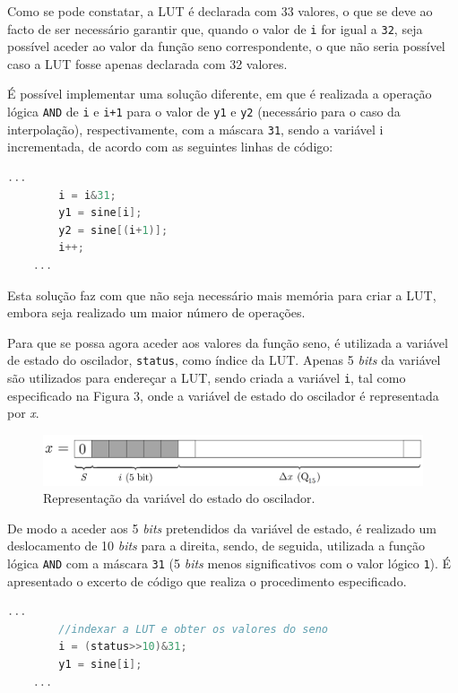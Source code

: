 \documentclass[11pt]{article}
\numberwithin{equation}{section}
\begin{document}
Como se pode constatar, a LUT é declarada com 33 valores, o que se deve ao facto de ser necessário garantir que, quando o valor de \texttt{i} for igual a \texttt{32}, seja possível aceder ao valor da função seno correspondente, o que não seria possível caso a LUT fosse apenas declarada com 32 valores.
 
É possível implementar uma solução diferente, em que é realizada a operação lógica \texttt{AND} de \texttt{i} e \texttt{i+1} para o valor de \texttt{y1} e \texttt{y2} (necessário para o caso  da interpolação), respectivamente, com a máscara \texttt{31}, sendo a variável i incrementada,  de acordo com as seguintes linhas de código:

\begin{lstlisting}[language=C]
	...
		i = i&31;
		y1 = sine[i];
		y2 = sine[(i+1)];
		i++;
	...
\end{lstlisting}

Esta solução faz com que não seja necessário mais memória para criar a LUT, embora seja realizado um maior número de operações.  

Para que se possa agora aceder aos valores da função seno, é utilizada a variável de estado do oscilador, \texttt{status}, como índice da LUT. Apenas 5 \textit{bits} da variável são utilizados para endereçar a LUT, sendo criada a variável \texttt{i}, tal como especificado na Figura 3, onde a variável de estado do oscilador é representada por \textit{x}.

\begin{figure}[H]
	\centering
	\includegraphics[keepaspectratio=true, scale=0.27]{teoricas/seno}
	\caption{Representação da variável do estado do oscilador.}
	\vspace{-0.8em}
	\label{fig:variavelestado}
\end{figure}

De modo a aceder aos 5 \textit{bits} pretendidos da variável de estado, é realizado um deslocamento de 10 \textit{bits} para a direita, sendo, de seguida, utilizada a função lógica \texttt{AND} com a máscara \texttt{31} (5 \textit{bits} menos significativos com o valor lógico \texttt{1}). É apresentado o excerto de código que realiza o procedimento especificado. 

\begin{lstlisting}[language=C]
	...
		//indexar a LUT e obter os valores do seno
		i = (status>>10)&31;
		y1 = sine[i]; 
	...
\end{lstlisting}
\end{document}
